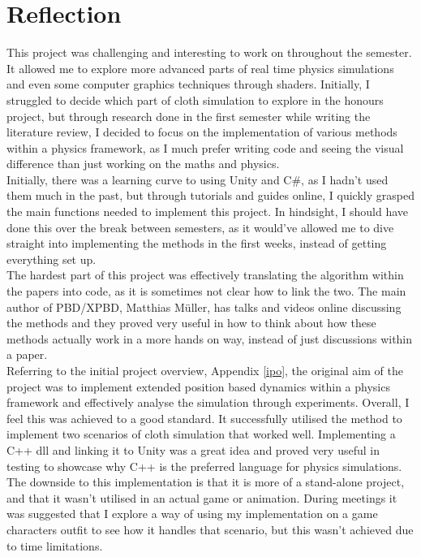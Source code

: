 \documentclass[12pt,a4paper]{article}
\begin{document}
\section{Reflection}
\label{reffy}
This project was challenging and interesting to work on throughout the semester. It allowed me to explore more advanced parts of real time physics simulations and even some computer graphics techniques through shaders. Initially, I struggled to decide which part of cloth simulation to explore in the honours project, but through research done in the first semester while writing the literature review, I decided to focus on the implementation of various methods within a physics framework, as I much prefer writing code and seeing the visual difference than just working on the maths and physics. \\
Initially, there was a learning curve to using Unity and C\#, as I hadn't used them much in the past, but through tutorials and guides online, I quickly grasped the main functions needed to implement this project. In hindsight, I should have done this over the break between semesters, as it would've allowed me to dive straight into implementing the methods in the first weeks, instead of getting everything set up. \\
The hardest part of this project was effectively translating the algorithm within the papers into code, as it is sometimes not clear how to link the two. The main author of PBD/XPBD, Matthias Müller, has talks and videos online discussing the methods and they proved very useful in how to think about how these methods actually work in a more hands on way, instead of just discussions within a paper. \\

Referring to the initial project overview, Appendix \ref{ipo}, the original aim of the project was to implement extended position based dynamics within a physics framework and effectively analyse the simulation through experiments. Overall, I feel this was achieved to a good standard. It successfully utilised the method to implement two scenarios of cloth simulation that worked well. Implementing a C++ dll and linking it to Unity was a great idea and proved very useful in testing to showcase why C++ is the preferred language for physics simulations. The downside to this implementation is that it is more of a stand-alone project, and that it wasn't utilised in an actual game or animation. During meetings it was suggested that I explore a way of using my implementation on a game characters outfit to see how it handles that scenario, but this wasn't achieved due to time limitations. \\
\end{document}
